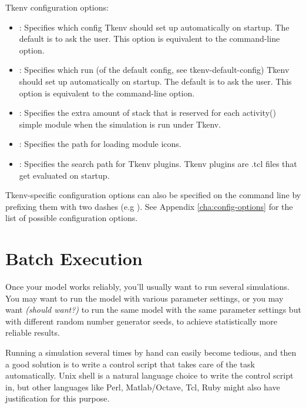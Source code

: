 Tkenv configuration options:
\begin{itemize}
  \item{:
    Specifies which config Tkenv should set up automatically on startup. The
    default is to ask the user. This option is equivalent to the 
    command-line option.}

  \item{: Specifies which run (of the default
    config, see tkenv-default-config) Tkenv should set up automatically on startup.
    The default is to ask the user. This option is equivalent to the 
    command-line option.}

  \item{:
    Specifies the extra amount of stack that is reserved for each activity()
    simple module when the simulation is run under Tkenv.}

  \item{: Specifies the path for loading module icons.}

  \item{:
    Specifies the search path for Tkenv plugins. Tkenv plugins are .tcl files
    that get evaluated on startup.}
\end{itemize}

Tkenv-specific configuration options can also be specified on the command line
by prefixing them with two dashes (e.g ). See
Appendix \ref{cha:config-options} for the list of possible configuration options.


\section{Batch Execution}
\label{sec:ch-run-sim:batch-execution}

Once your model works reliably, you'll usually want to run several
simulations. You may want to run the model with various
parameter settings, or you may want \textit{(should want?)} to
run the same model with the same parameter settings but with
different random number generator seeds, to achieve statistically
more reliable results.

Running a simulation several times by hand can easily become tedious,
and then a good solution is to write a control script that
takes care of the task automatically. Unix shell is
a natural language choice to write the control script in,
but other languages like Perl, Matlab/Octave, Tcl, Ruby might also have
justification for this purpose.

